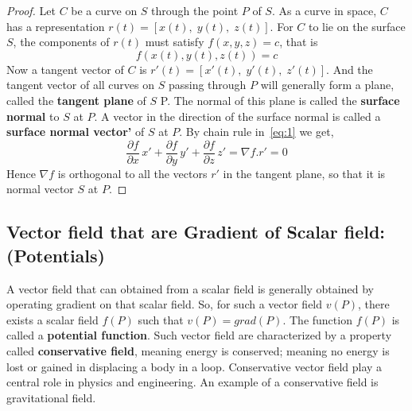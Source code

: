 \documentclass[aima331_lecturenotes_ku.tex]{subfiles}
\begin{document}
\begin{proof}
  Let $C$ be a curve on $S$ through the point $P$ of $S$. As a curve in space, $C$ has a representation $r(t)=[x(t), \;y(t), \; z(t)]$. For $C$ to lie on the surface $S$, the components of $r(t)$ must satisfy $f(x,y,z)=c$, that is
  \begin{equation}
    \label{eq:1}
    f(x(t),y(t),z(t))=c
  \end{equation}
  Now a tangent vector of $C$ is $r'(t)=[x'(t), \;y'(t), \; z'(t)]$. And the tangent vector of all curves on $S$ passing through $P$ will generally form a plane, called the \textbf{tangent plane} of $S$ P. The normal of this plane is called the \textbf{surface normal} to $S$ at $P$. A vector in the direction of the surface normal is called a \textbf{surface normal vector'} of $S$ at $P$. By chain rule in~\ref{eq:1} we get,
  $$\frac{\partial f}{\partial x}\, x' + \frac{\partial f}{\partial y}\, y' + \frac{\partial f}{\partial z}\, z' = \nabla f.r' = 0$$
  Hence $\nabla f$ is orthogonal to all the vectors $r'$ in the tangent plane, so that it is normal vector $S$ at $P$.
\end{proof}

\subsection{Vector field that are Gradient of Scalar field: (Potentials)}
A vector field that can obtained from a scalar field is generally obtained by operating gradient on that scalar field. So, for such a vector field $v(P)$, there exists a scalar field $f(P)$ such that $v(P)=grad(P)$. The function $f(P)$ is called a \textbf{potential function}. Such vector field are characterized by a property called \textbf{conservative field}, meaning energy is conserved; meaning no energy is lost or gained in displacing a body in a loop. Conservative vector field play a central role in physics and engineering. An example of a conservative field is gravitational field.
\end{document}
